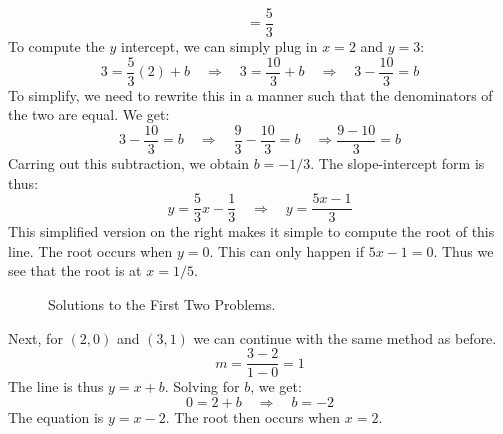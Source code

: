 \documentclass[crop=false,class=book,oneside]{standalone}                      %
\begin{document}
\begin{solution}
\begin{equation}
                 =\frac{5}{3}
            \end{equation}
            To compute the $y$ intercept, we can simply plug in $x=2$ and $y=3$:
            \begin{equation}
                3=\frac{5}{3}(2)+b
                \quad\Longrightarrow\quad
                3=\frac{10}{3}+b
                \quad\Longrightarrow\quad
                3-\frac{10}{3}=b
            \end{equation}
            To simplify, we need to rewrite this in a manner such that the
            denominators of the two are equal. We get:
            \begin{equation}
                3-\frac{10}{3}=b
                \quad\Longrightarrow\quad
                \frac{9}{3}-\frac{10}{3}=b
                \quad\Longrightarrow
                \frac{9-10}{3}=b
            \end{equation}
            Carring out this subtraction, we obtain $b=\minus{1}/3$. The
            slope-intercept form is thus:
            \begin{equation}
                y=\frac{5}{3}x-\frac{1}{3}
                \quad\Longrightarrow\quad
                y=\frac{5x-1}{3}
            \end{equation}
            This simplified version on the right makes it simple to compute the
            root of this line. The root occurs when $y=0$. This can only happen
            if $5x-1=0$. Thus we see that the root is at $x=1/5$.
            \begin{figure}
                \centering
                \captionsetup{type=figure}
                \begin{subfigure}[b]{0.49\textwidth}
                    \centering
                \end{subfigure}
                \begin{subfigure}[b]{0.49\textwidth}
                    \centering
                \end{subfigure}
                \caption{Solutions to the First Two Problems.}
                \label{fig:Solutions_to_First_Two_Problems}
            \end{figure}
            Next, for $(2,0)$ and $(3,1)$ we can continue with
            the same method as before.
            \begin{equation}
                m=\frac{3-2}{1-0}
                 =1
            \end{equation}
            The line is thus $y=x+b$. Solving for $b$, we get:
            \begin{equation}
                0=2+b
                \quad\Longrightarrow\quad
                b=\minus{2}
            \end{equation}
            The equation is $y=x-2$. The root then occurs when $x=2$.
        \end{solution}
\end{document}
